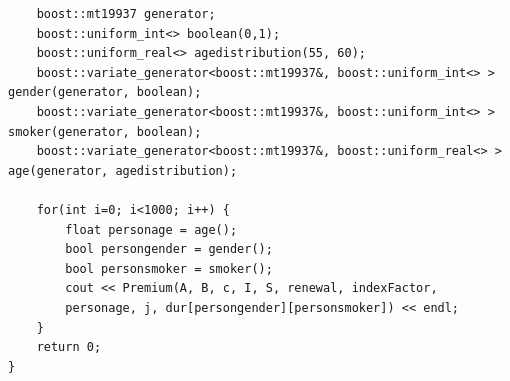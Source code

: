 \documentclass{report}
\begin{document}
\begin{verbatim}
    boost::mt19937 generator;
    boost::uniform_int<> boolean(0,1);
    boost::uniform_real<> agedistribution(55, 60);
    boost::variate_generator<boost::mt19937&, boost::uniform_int<> > gender(generator, boolean);
    boost::variate_generator<boost::mt19937&, boost::uniform_int<> > smoker(generator, boolean);
    boost::variate_generator<boost::mt19937&, boost::uniform_real<> > age(generator, agedistribution);

    for(int i=0; i<1000; i++) {
        float personage = age();
        bool persongender = gender();
        bool personsmoker = smoker();
        cout << Premium(A, B, c, I, S, renewal, indexFactor, 
        personage, j, dur[persongender][personsmoker]) << endl;
    }
	return 0;
}


\end{verbatim}    
\end{document}
